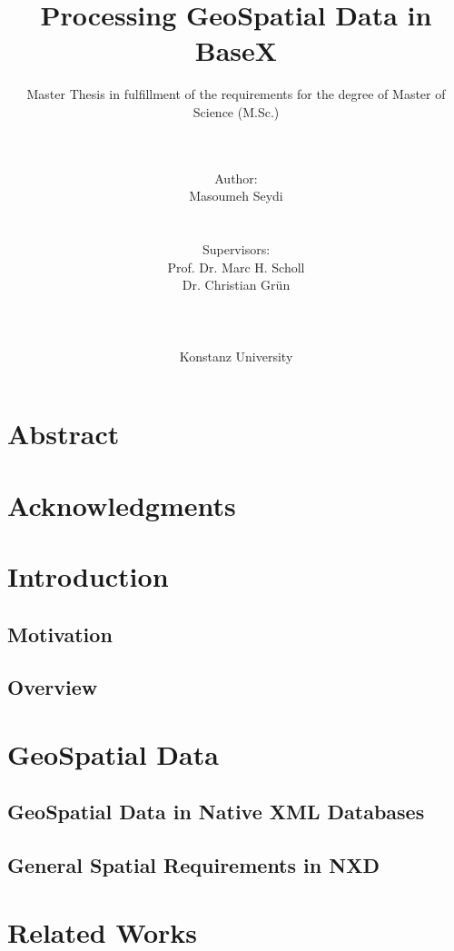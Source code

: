 \documentclass[a4paper,12pt]{article}
\title{Processing GeoSpatial Data in BaseX}
\subtitle{Master Thesis in fulfillment of the requirements for the degree of
Master of Science (M.Sc.)}
\author{\\\\Author: \\
	Masoumeh Seydi
	\\\\\\Supervisors: \\
	Prof. Dr. Marc H. Scholl \\ 
	Dr. Christian Gr{\"u}n \\
	\\\\\\
	Konstanz University}
\begin{document}
\maketitle
\thispagestyle{empty}

\newpage
\section*{Abstract}

\thispagestyle{empty}

\newpage
\section*{Acknowledgments}

\thispagestyle{empty}

\newpage
\tableofcontents

\thispagestyle{empty}
\newpage
\section{Introduction}
\setcounter{page}{1}

\subsection{Motivation}

\subsection{Overview}

\newpage
\section{GeoSpatial Data}

\subsection{GeoSpatial Data in Native XML Databases}

\subsection{General Spatial Requirements in NXD}
\newpage

\section{Related Works}

\newpage
\end{document}
